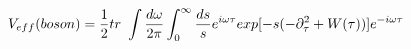 \begin{equation}
V_{eff}(boson) = \frac{1}{2} tr\ \int \frac{d\omega}{2\pi} \int_0^\infty 
\frac{ds}{s} 
e^{i\omega\tau} exp[-s(-\partial_{\tau}^2+W(\tau))] e^{-i\omega\tau} \\
\end{equation}

